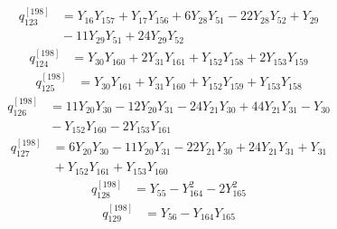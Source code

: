 \begin{equation}\label{q198:row:123}
\begin{aligned}
q_{123}^{[198]} &={} Y_{16}Y_{157} + Y_{17}Y_{156} + 6Y_{28}Y_{51} - 22Y_{28}Y_{52} + Y_{29}\\
&{} - 11Y_{29}Y_{51} + 24Y_{29}Y_{52}
\end{aligned}
\end{equation}
\begin{equation}\label{q198:row:124}
\begin{aligned}
q_{124}^{[198]} &={} Y_{30}Y_{160} + 2Y_{31}Y_{161} + Y_{152}Y_{158} + 2Y_{153}Y_{159}
\end{aligned}
\end{equation}
\begin{equation}\label{q198:row:125}
\begin{aligned}
q_{125}^{[198]} &={} Y_{30}Y_{161} + Y_{31}Y_{160} + Y_{152}Y_{159} + Y_{153}Y_{158}
\end{aligned}
\end{equation}
\begin{equation}\label{q198:row:126}
\begin{aligned}
q_{126}^{[198]} &={} 11Y_{20}Y_{30} - 12Y_{20}Y_{31} - 24Y_{21}Y_{30} + 44Y_{21}Y_{31} - Y_{30}\\
&{} - Y_{152}Y_{160} - 2Y_{153}Y_{161}
\end{aligned}
\end{equation}
\begin{equation}\label{q198:row:127}
\begin{aligned}
q_{127}^{[198]} &={} 6Y_{20}Y_{30} - 11Y_{20}Y_{31} - 22Y_{21}Y_{30} + 24Y_{21}Y_{31} + Y_{31}\\
&{} + Y_{152}Y_{161} + Y_{153}Y_{160}
\end{aligned}
\end{equation}
\begin{equation}\label{q198:row:128}
\begin{aligned}
q_{128}^{[198]} &={} Y_{55} - Y_{164}^{2} - 2Y_{165}^{2}
\end{aligned}
\end{equation}
\begin{equation}\label{q198:row:129}
\begin{aligned}
q_{129}^{[198]} &={} Y_{56} - Y_{164}Y_{165}
\end{aligned}
\end{equation}
